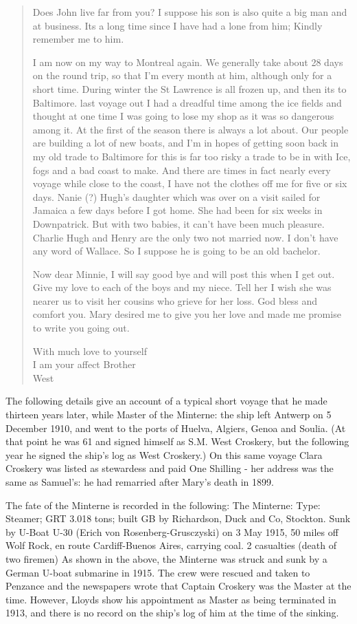 \begin{quotation}
Does John live far from you? I suppose his son is also quite a big man and at business. Its a long time since I have had a lone from him; Kindly remember me to him.

I am now on my way to Montreal again. We generally take about 28 days on the round trip, so that I'm every month at him, although only for a short time. During winter the St Lawrence is all frozen up, and then its to Baltimore. last voyage out I had a dreadful time among the ice fields and thought at one time I was going to lose my shop as it was so dangerous among it. At the first of the season there is always a lot about. Our people are building a lot of new boats, and I'm in hopes of getting soon back in my old trade to Baltimore for this is far too risky a trade to be in with Ice, fogs and a bad coast to make. And there are times in fact nearly every voyage while close to the coast, I have not the clothes off me for five or six days. Nanie (?) Hugh's daughter which was over on a visit sailed for Jamaica a few days before I got home. She had been for six weeks in Downpatrick. But with two babies, it can't have been much pleasure. Charlie Hugh and Henry are the only two not married now. I don't have any word of Wallace. So I suppose he is going to be an old bachelor.

Now dear Minnie, I will say good bye and will post this when I get out. Give my love to each of the boys and my niece. Tell her I wish she was nearer us to visit her cousins who grieve for her loss. God bless and comfort you. Mary desired me to give you her love and made me promise to write you going out.

With much love to yourself \\
I am your affect Brother \\
West 
\end{quotation}

The following details give an account of a typical short voyage that he made thirteen years later, while Master of the Minterne: the ship left Antwerp on 5 December 1910, and went to the ports of Huelva, Algiers, Genoa and Soulia. (At that point he was 61 and signed himself as S.M. West Croskery, but the following year he signed the ship's log as West Croskery.) On this same voyage Clara Croskery  was listed as stewardess and paid One Shilling - her address was the same as Samuel's: he had remarried after Mary's death in 1899.

The fate of the Minterne is recorded in the following: 
The Minterne: Type: Steamer; GRT 3.018 tons; built GB by Richardson, Duck and Co, Stockton. Sunk by U-Boat U-30 (Erich von Rosenberg-Grusczyski) on 3 May 1915, 50 miles off Wolf Rock, en route Cardiff-Buenos Aires, carrying coal. 2 casualties (death of two firemen) \cite{www.uboat.net/ww1/ships} As shown in the above, the Minterne was struck and sunk by a German U-boat submarine in 1915.  The crew were rescued and taken to Penzance and the newspapers wrote that Captain Croskery was the Master at the time. However, Lloyds show his appointment as Master as being terminated in 1913, and there is no record on the ship's log of him at the time of the sinking.

